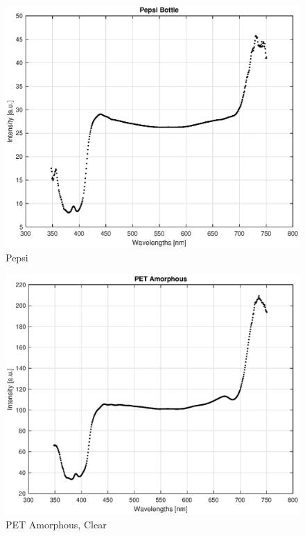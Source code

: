 \begin{appendices}
\begin{figure}
    \centering
    \includegraphics[width = 12cm]{Images/appendix/pepsi.eps}
    \caption[$\; \:$Pepsi]{Pepsi}
    \label{fig:pepsi}
\end{figure}

\begin{figure}
    \centering
    \includegraphics[width = 12cm]{Images/appendix/pet-amorphous-pristine-clear.eps}
    \caption[$\; \:$PET Amorphous]{PET Amorphous, Clear}
    \label{fig:pet}
\end{figure}


\end{appendices}
